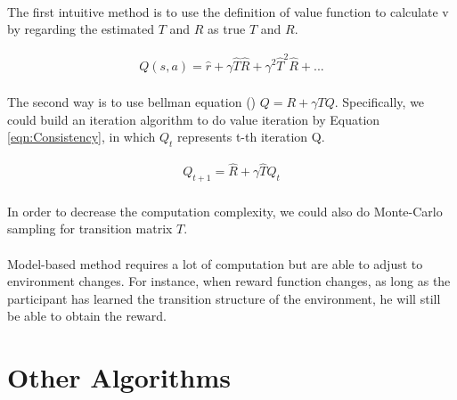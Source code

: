 \paragraph{}
The first intuitive method is to use the definition of value function to calculate v by regarding the estimated $T$ and $R$ as true $T$ and $R$. 

\begin{equation}
\begin{aligned}
Q(s,a)=\hat{r} + \gamma \hat{T}\hat{R} + \gamma^2\hat{T}^2\hat{R} + ...
\end{aligned}
\label{eqn:Enumeration}
\end{equation}

\paragraph{}
The second way is to use bellman equation (\cite{sutton1998introduction}) $Q = R+ \gamma TQ$. Specifically, we could build an iteration algorithm to do value iteration by Equation \ref{eqn:Consistency}, in which $Q_{t}$ represents t-th iteration Q. 

\begin{equation}
\begin{aligned}
Q_{t+1}=\hat{R}+\gamma \hat{T}Q_{t}
\end{aligned}
\label{eqn:Consistency}
\end{equation}

\paragraph{}
In order to decrease the computation complexity, we could also do Monte-Carlo sampling for transition matrix $T$. 

\paragraph{}
Model-based method requires a lot of computation but are able to adjust to environment changes. For instance, when reward function changes, as long as the participant has learned the transition structure of the environment, he will still be able to obtain the reward. 




\section{Other Algorithms}
